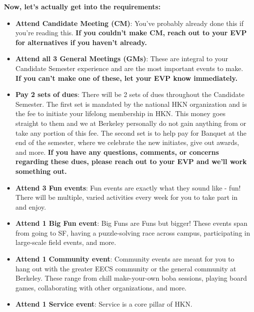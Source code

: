 \documentclass[11pt, article, oneside]{memoir}
\begin{document}
        \textbf{Now, let's actually get into the requirements:}
            \begin{itemize}
                \item
                    \textbf{Attend Candidate Meeting (CM)}: You've probably already done this if you're reading this.
                    \textbf{If you couldn't make CM, reach out to your EVP for alternatives if you haven't already.}
                \item
                    \textbf{Attend all 3 General Meetings (GMs)}: These are integral to your Candidate Semester experience and are the most important events to make.
                    \textbf{If you can't make one of these, let your EVP know immediately.}
                \item
                    \textbf{Pay 2 sets of dues}: There will be 2 sets of dues throughout the Candidate Semester.
                    The first set is mandated by the national HKN organization and is the fee to initiate your lifelong membership in HKN.
                    This money goes straight to them and we at Berkeley personally do not gain anything from or take any portion of this fee.
                    The second set is to help pay for Banquet at the end of the semester, where we celebrate the new initiates, give out awards, and more.
                    \textbf{If you have any questions, comments, or concerns regarding these dues, please reach out to your EVP and we'll work something out.}
                \item
                    \textbf{Attend 3 Fun events}: Fun events are exactly what they sound like - fun!
                    There will be multiple, varied activities every week for you to take part in and enjoy.
                \item
                    \textbf{Attend 1 Big Fun event}: Big Funs are Funs but bigger!
                    These events span from going to SF, having a puzzle-solving race across campus, participating in large-scale field events, and more.
                \item
                    \textbf{Attend 1 Community event}: Community events are meant for you to hang out with the greater EECS community or the general community at Berkeley.
                    These range from chill make-your-own boba sessions, playing board games, collaborating with other organizations, and more.
                \item
                    \textbf{Attend 1 Service event}: Service is a core pillar of HKN.

\end{itemize}
\end{document}
